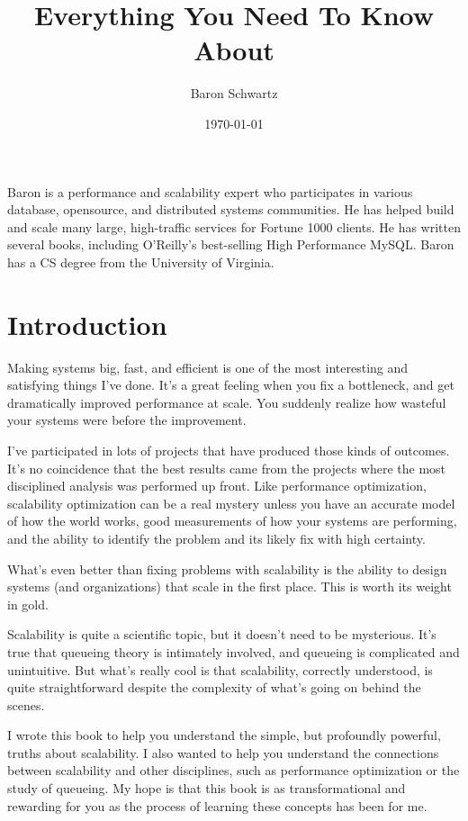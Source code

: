 \documentclass{vivid_layout}
\title{Everything You Need To Know About}{Scalability}
\date{\today}
\author{Baron Schwartz}{img/baron}
\begin{document}
\maketitle		%
\begin{bio}		%
Baron is a performance and scalability expert who participates in various
database, opensource, and distributed systems communities. He has helped build
and scale many large, high-traffic services for Fortune 1000 clients. He has
written several books, including O'Reilly's best-selling High Performance MySQL.
Baron has a CS degree from the University of Virginia.
\end{bio}
\tableofcontents	%

\section{Introduction}

Making systems big, fast, and efficient is one of the most interesting and
satisfying things I've done. It's a great feeling when you fix a bottleneck, and
get dramatically improved performance at scale. You suddenly realize how
wasteful your systems were before the improvement.

I've participated in lots of projects that have produced those kinds of outcomes.
It's no coincidence that the best results came from the projects where the most
disciplined analysis was performed up front. Like performance optimization,
scalability optimization can be a real mystery unless you have an accurate model
of how the world works, good measurements of how your systems are performing,
and the ability to identify the problem and its likely fix with high certainty.

What's even better than fixing problems with scalability is the ability to
design systems (and organizations) that scale in the first place. This is worth
its weight in gold.

Scalability is quite a scientific topic, but it doesn't need to be mysterious.
It's true that queueing theory is intimately involved, and queueing is
complicated and unintuitive. But what's really cool is that scalability,
correctly understood, is quite straightforward despite the complexity of what's
going on behind the scenes.

I wrote this book to help you understand the simple, but profoundly
powerful, truths about scalability. I also wanted to help you understand the
connections between scalability and other disciplines, such as performance
optimization or the study of queueing. My hope is that this book is as
transformational and rewarding for you as the process of learning these concepts
has been for me.
\end{document}
